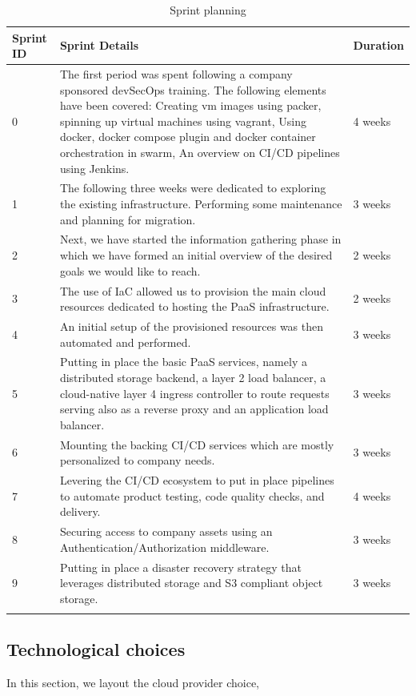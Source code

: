 \begin{longtable}[H]{|m{2cm}|m{10cm}|m{2cm}|}
\hline
 {\textbf{Sprint ID}} & {\textbf{Sprint Details }} & {\textbf{Duration }} \\ \hline 
0 
&
The first period was spent following a company sponsored devSecOps training. The following elements have been covered: 
Creating vm images using packer, spinning up virtual machines using vagrant,  
Using docker, docker compose plugin and docker container orchestration in swarm, 
An overview on CI/CD pipelines using Jenkins. 
&
4 weeks  \\
\hline
1 
&
The following three weeks were dedicated to exploring the existing infrastructure. Performing some maintenance and planning for migration. 
&
3 weeks  \\ \hline
2 
&
Next, we have started the information gathering phase in which we have formed an initial overview of the desired goals we would like to reach. 
&
2 weeks \\ \hline
3 
&
The use of IaC allowed us to provision the main cloud resources dedicated to hosting the PaaS infrastructure. 
&
2 weeks \\ \hline
4 
&
An initial setup of the provisioned resources was then automated and performed. 
&
3 weeks \\ \hline
5 
&
Putting in place the basic PaaS services, namely a distributed storage backend, a layer 2 load balancer, a cloud-native layer 4 ingress controller to route requests serving also as a reverse proxy and an application load balancer. 
&
3 weeks \\ \hline
6 
&
Mounting the backing CI/CD services which are mostly personalized to company needs. 
&
3 weeks \\ \hline
7 
&
Levering the CI/CD ecosystem to put in place pipelines to automate product testing, code quality checks, and delivery. 
&
4 weeks \\ \hline
8 
&
Securing access to company assets using an Authentication/Authorization middleware. 
&
3 weeks \\ \hline
9 
&
Putting in place a disaster recovery strategy that leverages distributed storage and S3 compliant object storage. 
&
3 weeks \\ \hline

\caption{ Sprint planning}
\end{longtable}

\newpage

\subsection{Technological choices }
In this section, we layout the cloud provider choice,
